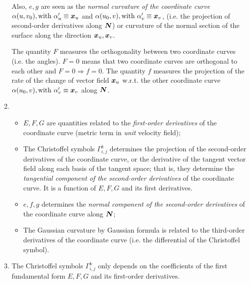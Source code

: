 \documentclass[11pt]{article}
\begin{document}
\begin{enumerate}
Also, $e, g$ are seen as the \emph{normal curvature of the coordinate curve} $\alpha(u, v_{0}), \text{with }\alpha_{u}' \equiv \boldsymbol{x}_{u}$ and $\alpha(u_{0}, v), \text{with }\alpha_{v}' \equiv \boldsymbol{x}_{v}$, (i.e. the projection of second-order derivatives along $\boldsymbol{N}$) or curvature of the normal section of the surface along the direction $\boldsymbol{x}_{u}, \boldsymbol{x}_{v}$.

 The quantity $F$ measures the orthogonality between two coordinate curves (i.e. the angles). $F=0$ means that two coordinate curves are orthogonal to each other and $F=0 \Rightarrow f=0$. The quantity $f$ measures the projection of the rate of the change of vector field $\boldsymbol{x}_{u}$ w.r.t. the other coordinate curve $\alpha(u_{0}, v), \text{with }\alpha_{v}' \equiv \boldsymbol{x}_{v}$ along $\boldsymbol{N}$.



\item 
\begin{itemize}
\item $E,F,G$ are quantities related to the \emph{first-order derivatives} of the coordinate curve (metric term in \emph{unit} velocity field);

\item The Christoffel symbols  $\Gamma_{i,j}^{k}$ determines  the projection of the second-order derivatives of the coordinate curve, or the derivative of the tangent vector field along each basis of the tangent space; that is, they determine the \emph{tangential component of the second-order derivatives} of the coordinate curve. It is a function of $E,F,G$ and its first derivatives. 

\item $e,f,g$ determines the \emph{normal component of the second-order derivatives} of the coordinate curve along $\boldsymbol{N}$;

\item The Gaussian curvature by Gaussian formula is related to the third-order derivatives of the coordinate curve (i.e. the differential of the Christoffel symbol). 
\end{itemize}

\item The Christoffel symbols $\Gamma_{i,j}^{k}$ only depends on the coefficients of the first fundamental form $E,F,G$ and its first-order derivatives. 
\end{enumerate}
\end{document}
